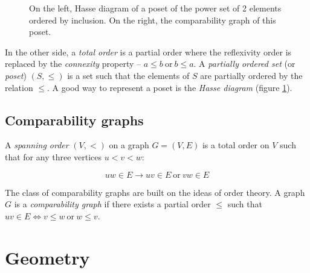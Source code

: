 \begin{figure}
\centering

\begin{scaletikzpicturetowidth}{\textwidth}
\end{scaletikzpicturetowidth}

\caption{On the left, Hasse diagram of a poset of the power set of 2 elements ordered by inclusion.
On the right, the comparability graph of this poset.}
\label{fig:hasse}
\end{figure}

In the other side, a \emph{total order} is a partial order where the reflexivity order is replaced by the \emph{connexity} property -- $a \leq b\ \text{or}\  b \leq a$. A \emph{partially ordered set} (or \emph{poset}) $(S,\leqslant)$ is a set such that the elements of $S$ are partially ordered by the relation $\leqslant$. A good way to represent a poset is the \emph{Hasse diagram} (figure \ref{fig:hasse}).

\subsection{Comparability graphs}

A \emph{spanning order} $(V,<)$ on a graph $G = (V,E)$ is a total order on $V$ such that for any three vertices $u < v < w$:

  $$uw \in E \to uv \in E\ \text{or}\ vw \in E$$

The class of comparability graphs are built on the ideas of order theory. A graph $G$ is a \emph{comparability graph} if there exists a partial order $\leqslant$ such that $uv \in E \Leftrightarrow v \leqslant w\  \text{or}\  w \leqslant v$.

\section{Geometry}
